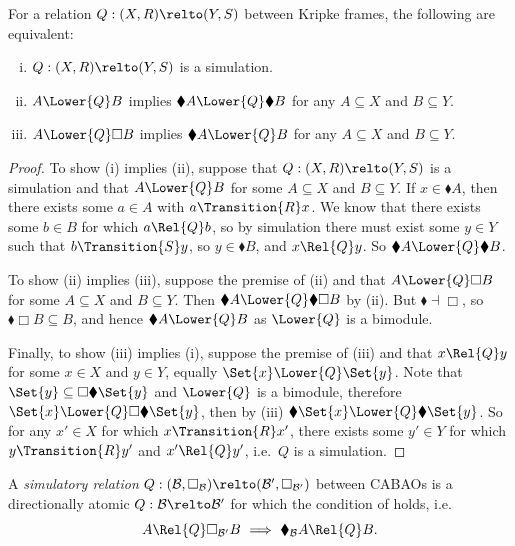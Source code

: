 \begin{lemma}\label{lemma:sim-black}\label{lemma:simulatory}
  For a relation \(Q : (X, R) \relto (Y, S)\) between Kripke frames,
  the following are equivalent:
  \begin{enumerate}[(i)]
  \item \(Q : (X, R) \relto (Y, S)\) is a simulation.
  \item \(A \Lower{Q} B\) implies
    \(\blacklozenge A \Lower{Q} \blacklozenge B\) for any
    \(A \subseteq X\) and \(B \subseteq Y\).
  \item \(A \Lower{Q} \Box B\) implies \(\blacklozenge A \Lower{Q} B\)
    for any \(A \subseteq X\) and \(B \subseteq Y\).
  \end{enumerate}
\end{lemma}
\begin{proof}
  To show (i) implies (ii), suppose that \(Q : (X, R) \relto (Y, S)\)
  is a simulation and that \(A \Lower{Q} B\) for some
  \(A \subseteq X\) and \(B \subseteq Y\). If
  \(x \in \blacklozenge A\), then there exists some \(a \in A\) with
  \(a \Transition{R} x\). We know that there exists some \(b \in B\)
  for which \(a \Rel{Q} b\), so by simulation there must exist some
  \(y \in Y\) such that \(b \Transition{S} y\), so
  \(y \in \blacklozenge B\), and \(x \Rel{Q} y\). So
  \(\blacklozenge A \Lower{Q} \blacklozenge B\).

  To show (ii) implies (iii), suppose the premise of (ii) and that
  \(A \Lower{Q} \Box B\) for some \(A \subseteq X\) and
  \(B \subseteq Y\).  Then
  \(\blacklozenge A \Lower{Q} \blacklozenge \Box B\) by (ii). But
  \(\blacklozenge \dashv \Box\), so
  \(\blacklozenge \Box B \subseteq B\), and hence
  \(\blacklozenge A \Lower{Q} B\) as \(\Lower{Q}\) is a bimodule.

  Finally, to show (iii) implies (i), suppose the premise of (iii) and
  that \(x \Rel{Q} y\) for some \(x \in X\) and \(y \in Y\), equally
  \(\Set{x} \Lower{Q} \Set{y}\). Note that
  \(\Set{y} \subseteq \Box \blacklozenge \Set{y}\) and \(\Lower{Q}\)
  is a bimodule, therefore
  \(\Set{x} \Lower{Q} \Box \blacklozenge \Set{y}\), then by (iii)
  \(\blacklozenge \Set{x} \Lower{Q} \blacklozenge \Set{y}\).  So for
  any \(x' \in X\) for which \(x \Transition{R} x'\), there exists
  some \(y' \in Y\) for which \(y \Transition{R} y'\) and
  \(x' \Rel{Q} y'\), i.e.\ \(Q\) is a simulation.
\end{proof}

\begin{definition}
  A \emph{simulatory relation}
  \(Q : (\mathcal{B}, \Box_\mathcal{B}) \relto (\mathcal{B}',
  \Box_{\mathcal{B}'})\) between CABAOs is a directionally atomic
  \(Q : \mathcal{B} \relto \mathcal{B}'\) for which the condition of
   holds, i.e.\
  \[
    A \Rel{Q} \Box_{\mathcal{B}'} B\
    \Longrightarrow\
    \blacklozenge_\mathcal{B} A \Rel{Q} B.
  \]
\end{definition}

